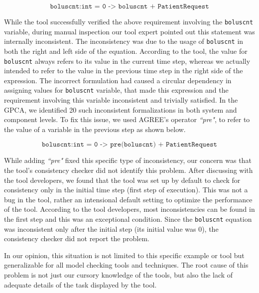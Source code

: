 $$ \texttt{boluscnt:int = 0 -> boluscnt + PatientRequest} $$

While the tool successfully verified the above requirement involving the \texttt{boluscnt} variable, during manual inspection our tool expert pointed out this statement was internally inconsistent. The inconsistency was due to the usage of \texttt{boluscnt} in both the right and left side of the equation. According to the tool, the value for \texttt{boluscnt} always refers to its value in the current time step, whereas we actually intended to refer to the value in the previous time step in the right side of the expression. The incorrect formulation had caused a circular dependency in assigning values for \texttt{boluscnt} variable, that made this expression and the requirement involving this variable inconsistent and trivially satisfied. In the GPCA, we identified 20 such inconsistent formalizations in both system and component levels. To fix this issue, we used AGREE's operator \emph{``pre"}, to refer to the value of a variable in the previous step as shown below.

$$ \texttt{boluscnt:int = 0 -> pre(boluscnt) + PatientRequest} $$

While adding \emph{``pre"} fixed this specific type of inconsistency, our concern was that the tool's consistency checker did not identify this problem. After discussing with the tool developers, we found that the tool was set up by default to check for consistency only in the initial time step (first step of execution). This was not a bug in the tool, rather an intensional default setting to optimize the performance of the tool. According to the tool developers, most inconsistencies can be found in the first step and this was an exceptional condition. Since the \texttt{boluscnt} equation was inconsistent only after the initial step (its initial value was 0), the consistency checker did not report the problem. 

In our opinion, this situation is not limited to this specific example or tool but generalizable for all model checking tools and techniques. The root cause of this problem is not just our cursory knowledge of the tools, but also the lack of adequate details of the task displayed by the tool. %


%
%
%
